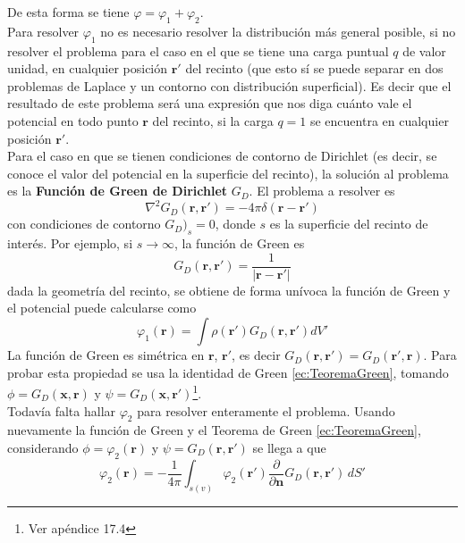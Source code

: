 De esta forma se tiene $\varphi = \varphi_{1} + \varphi_{2}$.\\
\indent Para resolver $\varphi_{1}$ no es necesario resolver la distribución más general posible, si no resolver el problema para el caso en el que se tiene una carga puntual $q$ de valor unidad, en cualquier posición $\textbf{r}'$ del recinto (que esto sí se puede separar en dos problemas de Laplace y un contorno con distribución superficial). Es decir que el resultado de este problema será una expresión que nos diga cuánto vale el potencial en todo punto $\textbf{r}$ del recinto, si la carga $q = 1$ se encuentra en cualquier posición $\textbf{r}'$.\\
\indent Para el caso en que se tienen condiciones de contorno de Dirichlet (es decir, se conoce el valor del potencial en la superficie del recinto), la solución al problema es la \textbf{Función de Green de Dirichlet} $G_{D}$. El problema a resolver es
\begin{equation*}
    \nabla^{2}G_{D}(\textbf{r},\textbf{r}') = -4\pi\delta (\textbf{r} - \textbf{r}')
\end{equation*}
con condiciones de contorno $G_{D}\big)_{s} = 0$, donde $s$ es la superficie del recinto de interés. Por ejemplo, si $s\to \infty$, la función de Green es
\begin{equation*}
    G_{D}(\textbf{r},\textbf{r}') = \frac{1}{|\textbf{r}-\textbf{r}'|}
\end{equation*}
dada la geometría del recinto, se obtiene de forma unívoca la función de Green y el potencial puede calcularse como
\begin{equation*}
    \varphi_{1}(\textbf{r}) = \int \rho(\textbf{r}')G_{D}(\textbf{r},\textbf{r}')dV'
\end{equation*}
La función de Green es simétrica en $\textbf{r}$, $\textbf{r}'$, es decir $G_{D}(\textbf{r},\textbf{r}') = G_{D}(\textbf{r}',\textbf{r})$. Para probar esta propiedad se usa la identidad de Green \eqref{ec:TeoremaGreen}, tomando $\phi = G_{D}(\textbf{x},\textbf{r})$ y $\psi = G_{D}(\textbf{x},\textbf{r}')$\footnote{Ver apéndice 17.4}.\\
\indent Todavía falta hallar $\varphi_{2}$ para resolver enteramente el problema. Usando nuevamente la función de Green y el Teorema de Green \eqref{ec:TeoremaGreen}, considerando $\phi = \varphi_{2}(\textbf{r})$ y $\psi = G_{D}(\textbf{r},\textbf{r}')$ se llega a que
\begin{equation*}
    \varphi_{2}(\textbf{r}) =
    -\frac{1}{4\pi}\int_{s(v)} \varphi_{2}(\textbf{r}')
    \frac{\partial}{\partial \textbf{n}}G_{D}(\textbf{r},\textbf{r}')\,dS'
\end{equation*}
